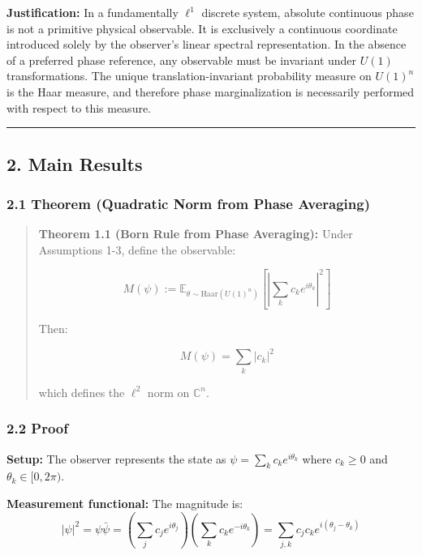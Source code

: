 \documentclass[
]{article}
\begin{document}
\textbf{Justification:} In a fundamentally \(\ell^1\) discrete system,
absolute continuous phase is not a primitive physical observable. It is
exclusively a continuous coordinate introduced solely by the observer's
linear spectral representation. In the absence of a preferred phase
reference, any observable must be invariant under \(U(1)\)
transformations. The unique translation-invariant probability measure on
\(U(1)^n\) is the Haar measure, and therefore phase marginalization is
necessarily performed with respect to this measure.

\begin{center}\rule{0.5\linewidth}{0.5pt}\end{center}

\subsection{2. Main Results}\label{main-results}

\subsubsection{2.1 Theorem (Quadratic Norm from Phase
Averaging)}\label{theorem-quadratic-norm-from-phase-averaging}

\begin{quote}
\textbf{Theorem 1.1 (Born Rule from Phase Averaging):} Under Assumptions
1-3, define the observable:

\[ M(\psi) := \mathbb{E}_{\theta \sim \text{Haar}(U(1)^n)} \left[ \left| \sum_k c_k e^{i\theta_k} \right|^2 \right] \]

Then:

\[ M(\psi) = \sum_k |c_k|^2 \]

which defines the \(\ell^2\) norm on \(\mathbb{C}^n\).
\end{quote}

\subsubsection{2.2 Proof}\label{proof}

\textbf{Setup:} The observer represents the state as
\(\psi = \sum_k c_k e^{i\theta_k}\) where \(c_k \geq 0\) and
\(\theta_k \in [0, 2\pi)\).

\textbf{Measurement functional:} The magnitude is:
\[|\psi|^2 = \psi \bar{\psi} = \left(\sum_j c_j e^{i\theta_j}\right)\left(\sum_k c_k e^{-i\theta_k}\right) = \sum_{j,k} c_j c_k e^{i(\theta_j - \theta_k)}\]
\end{document}
